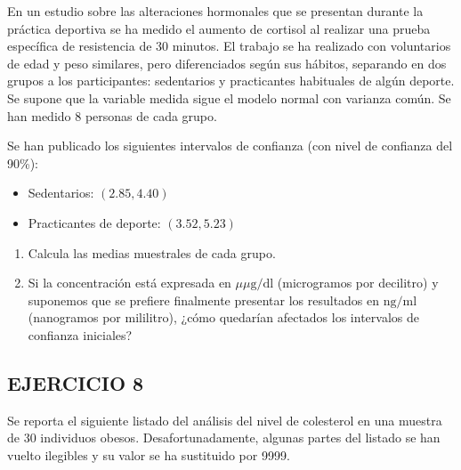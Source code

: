 \documentclass[
]{article}
\newenvironment{Shaded}{\begin{snugshade}}{\end{snugshade}}
\newcommand{\DecValTok}[1]{\textcolor[rgb]{0.00,0.00,0.81}{#1}}
\newcommand{\ErrorTok}[1]{\textcolor[rgb]{0.64,0.00,0.00}{\textbf{#1}}}
\newcommand{\FloatTok}[1]{\textcolor[rgb]{0.00,0.00,0.81}{#1}}
\newcommand{\NormalTok}[1]{#1}
\newcommand{\SpecialCharTok}[1]{\textcolor[rgb]{0.81,0.36,0.00}{\textbf{#1}}}
\providecommand{\tightlist}{%
  \setlength{\itemsep}{0pt}\setlength{\parskip}{0pt}}
\begin{document}
En un estudio sobre las alteraciones hormonales que se presentan durante la práctica deportiva se ha medido el aumento de cortisol al realizar una prueba específica de resistencia de 30 minutos. El trabajo se ha realizado con voluntarios de edad y peso similares, pero diferenciados según sus hábitos, separando en dos grupos a los participantes: sedentarios y practicantes habituales de algún deporte. Se supone que la variable medida sigue el modelo normal con varianza común. Se han medido 8 personas de cada grupo.

Se han publicado los siguientes intervalos de confianza (con nivel de confianza del 90\%):

\begin{itemize}
\tightlist
\item
  Sedentarios: \((2.85,4.40)\)\\
\item
  Practicantes de deporte: \((3.52,5.23)\)
\end{itemize}

\begin{enumerate}
\def\labelenumi{\alph{enumi})}
\tightlist
\item
  Calcula las medias muestrales de cada grupo.\\
\item
  Si la concentración está expresada en \(\mu \mu \mathrm{g} / \mathrm{dl}\) (microgramos por decilitro) y suponemos que se prefiere finalmente presentar los resultados en \(\mathrm{ng} / \mathrm{ml}\) (nanogramos por mililitro), ¿cómo quedarían afectados los intervalos de confianza iniciales?
\end{enumerate}

\subsection{EJERCICIO 8}\label{ejercicio-8-3}

Se reporta el siguiente listado del análisis del nivel de colesterol en una muestra de 30 individuos obesos. Desafortunadamente, algunas partes del listado se han vuelto ilegibles y su valor se ha sustituido por 9999.

\begin{Shaded}
\end{Shaded}
\end{document}
